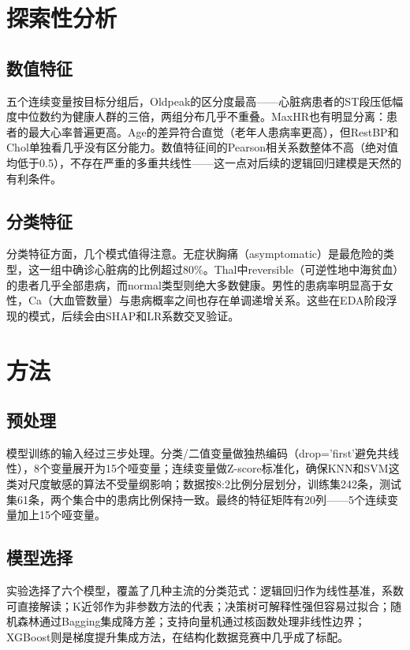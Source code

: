 \documentclass[12pt,a4paper]{ctexart}
\begin{document}
\section{探索性分析}

\subsection{数值特征}

五个连续变量按目标分组后，Oldpeak的区分度最高——心脏病患者的ST段压低幅度中位数约为健康人群的三倍，两组分布几乎不重叠。MaxHR也有明显分离：患者的最大心率普遍更高。Age的差异符合直觉（老年人患病率更高），但RestBP和Chol单独看几乎没有区分能力。数值特征间的Pearson相关系数整体不高（绝对值均低于0.5），不存在严重的多重共线性——这一点对后续的逻辑回归建模是天然的有利条件。

\subsection{分类特征}

分类特征方面，几个模式值得注意。无症状胸痛（asymptomatic）是最危险的类型，这一组中确诊心脏病的比例超过80\%。Thal中reversible（可逆性地中海贫血）的患者几乎全部患病，而normal类型则绝大多数健康。男性的患病率明显高于女性，Ca（大血管数量）与患病概率之间也存在单调递增关系。这些在EDA阶段浮现的模式，后续会由SHAP和LR系数交叉验证。

\section{方法}

\subsection{预处理}

模型训练的输入经过三步处理。分类/二值变量做独热编码（drop='first'避免共线性），8个变量展开为15个哑变量；连续变量做Z-score标准化，确保KNN和SVM这类对尺度敏感的算法不受量纲影响；数据按8:2比例分层划分，训练集242条，测试集61条，两个集合中的患病比例保持一致。最终的特征矩阵有20列——5个连续变量加上15个哑变量。

\subsection{模型选择}

实验选择了六个模型，覆盖了几种主流的分类范式：逻辑回归作为线性基准，系数可直接解读；K近邻作为非参数方法的代表；决策树可解释性强但容易过拟合；随机森林通过Bagging集成降方差；支持向量机通过核函数处理非线性边界；XGBoost则是梯度提升集成方法，在结构化数据竞赛中几乎成了标配。
\end{document}

